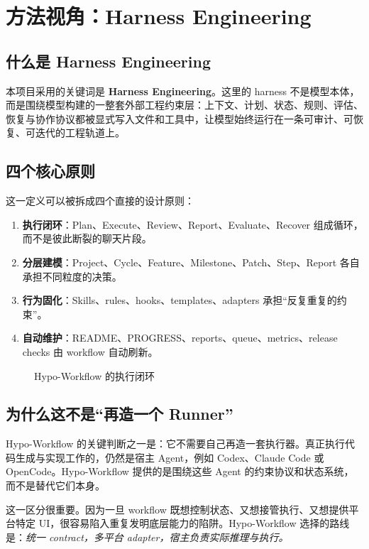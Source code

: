 \documentclass[
  outputdir=build,
  chapterstyle=cn,
  colorscheme=Simple,
  fontset=tech,
  code=false
]{Hypo-Note}
\begin{document}
\chapter{方法视角：Harness Engineering}

\section{什么是 Harness Engineering}

本项目采用的关键词是 \textbf{Harness Engineering}。这里的 harness 不是模型本体，而是围绕模型构建的一整套外部工程约束层：上下文、计划、状态、规则、评估、恢复与协作协议都被显式写入文件和工具中，让模型始终运行在一条可审计、可恢复、可迭代的工程轨道上。

\section{四个核心原则}

这一定义可以被拆成四个直接的设计原则：

\begin{enumerate}[leftmargin=2em]
  \item \textbf{执行闭环}：Plan、Execute、Review、Report、Evaluate、Recover 组成循环，而不是彼此断裂的聊天片段。
  \item \textbf{分层建模}：Project、Cycle、Feature、Milestone、Patch、Step、Report 各自承担不同粒度的决策。
  \item \textbf{行为固化}：Skills、rules、hooks、templates、adapters 承担“反复重复的约束”。
  \item \textbf{自动维护}：README、PROGRESS、reports、queue、metrics、release checks 由 workflow 自动刷新。
\end{enumerate}

\begin{figure}[H]
  \centering
  
  \caption{Hypo-Workflow 的执行闭环}
\end{figure}

\section{为什么这不是“再造一个 Runner”}

Hypo-Workflow 的关键判断之一是：它不需要自己再造一套执行器。真正执行代码生成与实现工作的，仍然是宿主 Agent，例如 Codex、Claude Code 或 OpenCode。Hypo-Workflow 提供的是围绕这些 Agent 的约束协议和状态系统，而不是替代它们本身。

这一区分很重要。因为一旦 workflow 既想控制状态、又想接管执行、又想提供平台特定 UI，很容易陷入重复发明底层能力的陷阱。Hypo-Workflow 选择的路线是：\emph{统一 contract，多平台 adapter，宿主负责实际推理与执行。}
\end{document}
